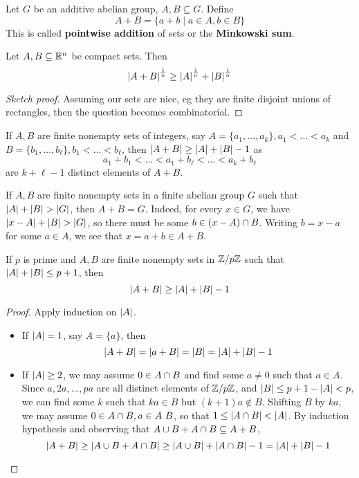 \documentclass{article}
\begin{document}
Let $G$ be an additive abelian group, $A, B \subseteq G$. Define
$$A + B = \{a + b \mid a \in A, b \in B\}$$
This is called {\bf pointwise addition} of sets or the {\bf Minkowski sum}.

\begin{nthm}
  Let $A, B \subseteq \mathbb R^n$ be compact sets. Then
  $$\left\lvert A + B\right\rvert^{\frac 1n} \ge \left\lvert A\right\rvert^{\frac 1n} + \left\lvert B\right\rvert^{\frac 1n}$$
\end{nthm}
\begin{proof}[Sketch proof]
  Assuming our sets are nice, eg they are finite disjoint unions of rectangles, then the question becomes combinatorial.
\end{proof}

If $A, B$ are finite nonempty sets of integers, say $A = \{a_1, \dots, a_k\}, a_1 < \dots < a_k$ and $B = \{b_1, \dots, b_\ell\}, b_1 < \dots < b_\ell$, then $\left\lvert A + B\right\rvert \ge \left\lvert A\right\rvert + \left\lvert B\right\rvert - 1$ as
$$a_1 + b_1 < \dots < a_1 + b_\ell < \dots < a_k + b_\ell$$
are $k + \ell - 1$ distinct elements of $A + B$.

If $A, B$ are finite nonempty sets in a finite abelian group $G$ such that $\left\lvert A\right\rvert + \left\lvert B\right\rvert > \left\lvert G\right\rvert$, then $A + B = G$. Indeed, for every $x \in G$, we have $\left\lvert x - A\right\rvert + \left\lvert B\right\rvert > \left\lvert G\right\rvert$, so there must be some $b \in (x - A) \cap B$. Writing $b = x - a$ for some $a \in A$, we see that $x = a + b \in A + B$.

\newlec

\begin{nthm}\label{thm:cd}
  If $p$ is prime and $A, B$ are finite nonempty sets in $\mathbb Z/p\mathbb Z$ such that $\left\lvert A\right\rvert + \left\lvert B\right\rvert \le p + 1$, then
  $$\left\lvert A + B\right\rvert \ge \left\lvert A\right\rvert + \left\lvert B\right\rvert - 1$$
\end{nthm}
\begin{proof}
  Apply induction on $\left\lvert A\right\rvert$.
  \begin{itemize}
    \item If $\left\lvert A\right\rvert = 1$, say $A = \{a\}$, then
    $$\left\lvert A + B\right\rvert = \left\lvert a + B\right\rvert = \left\lvert B\right\rvert = \left\lvert A\right\rvert + \left\lvert B\right\rvert - 1$$
    \item If $\left\lvert A\right\rvert \ge 2$, we may assume $0 \in A \cap B$ and find some $a \ne 0$ such that $a \in A$. Since $a, 2a, \dots, pa$ are all distinct elements of $\mathbb Z/p\mathbb Z$, and $\left\lvert B\right\rvert \le p + 1 - \left\lvert A\right\rvert < p$, we can find some $k$ such that $ka \in B$ but $(k + 1)a \nin B$. Shifting $B$ by $ka$, we may assume $0 \in A \inter B, a \in A \ B$, so that $1 \le \left\lvert A \cap B\right\rvert < \left\lvert A\right\rvert$. By induction hypothesis and observing that $A \cup B + A \cap B \subseteq A + B$,
    $$\left\lvert A + B\right\rvert \ge \left\lvert A \cup B + A \cap B\right\rvert \ge \left\lvert A \cup B\right\rvert + \left\lvert A \cap B\right\rvert - 1 = \left\lvert A\right\rvert + \left\lvert B\right\rvert - 1$$
  \end{itemize}
\end{proof}
\end{document}
